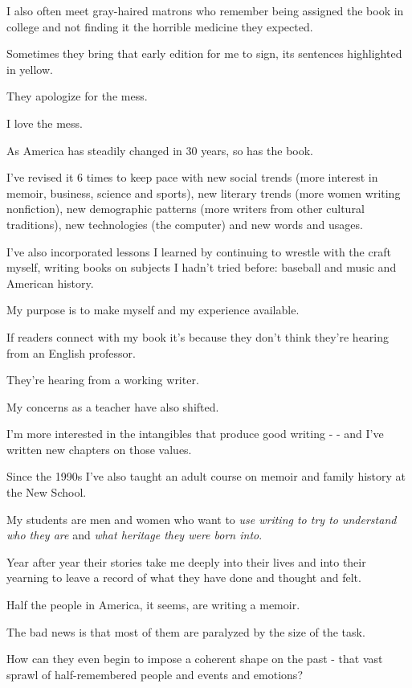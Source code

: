 \documentclass{book}
\numberwithin{equation}{section}
\begin{document}
I also often meet gray-haired matrons who remember being assigned the book in college and not finding it the horrible medicine they expected.

Sometimes they bring that early edition for me to sign, its sentences highlighted in yellow.

They apologize for the mess.

I love the mess.

As America has steadily changed in 30 years, so has the book.

I've revised it 6 times to keep pace with new social trends (more interest in memoir, business, science and sports), new literary trends (more women writing nonfiction), new demographic patterns (more writers from other cultural traditions), new technologies (the computer) and new words and usages.

I've also incorporated lessons I learned by continuing to wrestle with the craft myself, writing books on subjects I hadn't tried before: baseball and music and American history.

My purpose is to make myself and my experience available.

If readers connect with my book it's because they don't think they're hearing from an English professor.

They're hearing from a working writer.

%
My concerns as a teacher have also shifted.

I'm more interested in the intangibles that produce good writing -  - and I've written new chapters on those values.

Since the 1990s I've also taught an adult course on memoir and family history at the New School.

My students are men and women who want to \textit{use writing to try to understand who they are} and \textit{what heritage they were born into}.

Year after year their stories take me deeply into their lives and into their yearning to leave a record of what they have done and thought and felt.

Half the people in America, it seems, are writing a memoir.

%
The bad news is that most of them are paralyzed by the size of the task.

How can they even begin to impose a coherent shape on the past - that vast sprawl of half-remembered people and events and emotions?
\end{document}
